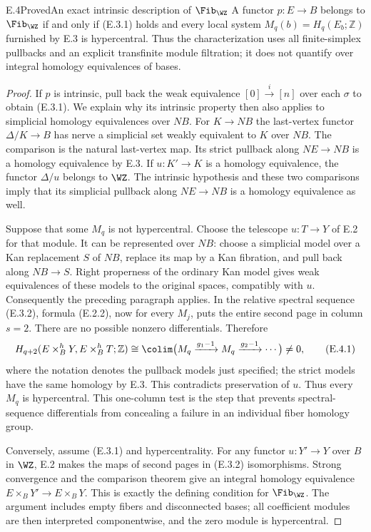 \begin{claim}{E.4}{Proved}{An exact intrinsic description of $\Fib_{\WZ}$}
A functor $p:E\to B$ belongs to $\Fib_{\WZ}$ if and only if
(E.3.1) holds and every local system
$M_q(b)=H_q(E_b;\mathbb Z)$ furnished by E.3 is hypercentral.
Thus the characterization uses all finite-simplex pullbacks and
an explicit transfinite module filtration; it does not quantify
over integral homology equivalences of bases.
\end{claim}
\begin{proof}
If $p$ is intrinsic, pull back the weak equivalence
$[0]\xrightarrow{i}[n]$ over each $\sigma$ to obtain (E.3.1).
We explain why its intrinsic property then also applies to
simplicial homology equivalences over $NB$. For $K\to NB$ the
last-vertex functor $\Delta/K\to B$ has nerve a simplicial set
weakly equivalent to $K$ over $NB$. The comparison is the natural
last-vertex map. Its strict pullback along $NE\to NB$ is a homology
equivalence by E.3. If $u:K'\to K$ is a homology equivalence, the
functor $\Delta/u$ belongs to $\WZ$. The intrinsic hypothesis and
these two comparisons imply that its simplicial pullback along
$NE\to NB$ is a homology equivalence as well.

Suppose that some $M_q$ is not hypercentral. Choose the telescope
$u:T\to Y$ of E.2 for that module. It can be represented over $NB$:
choose a simplicial model over a Kan replacement $S$ of $NB$, replace
its map by a Kan fibration, and pull back along $NB\to S$. Right
properness of the ordinary Kan model gives weak equivalences of
these models to the original spaces, compatibly with $u$.
Consequently the preceding paragraph applies. In the relative
spectral sequence (E.3.2), formula (E.2.2), now for every $M_j$,
puts the entire second page in column $s=2$. There are no possible
nonzero differentials. Therefore
\[
 H_{q+2}(E\times_B^hY,E\times_B^hT;\mathbb Z)
   \cong\colim\bigl(M_q\xrightarrow{g_1-1}M_q
                          \xrightarrow{g_2-1}\cdots\bigr)\ne0,
                                                               \tag{E.4.1}
\]
where the notation denotes the pullback models just specified;
the strict models have the same homology by E.3.
This contradicts preservation of $u$. Thus every $M_q$ is
hypercentral. This one-column test is the step that prevents
spectral-sequence differentials from concealing a failure in an
individual fiber homology group.

Conversely, assume (E.3.1) and hypercentrality. For any functor
$u:Y'\to Y$ over $B$ in $\WZ$, E.2 makes the maps of second pages
in (E.3.2) isomorphisms. Strong convergence and the comparison
theorem give an integral homology equivalence
$E\times_BY'\to E\times_BY$. This is exactly the defining
condition for $\Fib_{\WZ}$.
The argument includes empty fibers and disconnected bases; all
coefficient modules are then interpreted componentwise, and the
zero module is hypercentral.
\end{proof}

